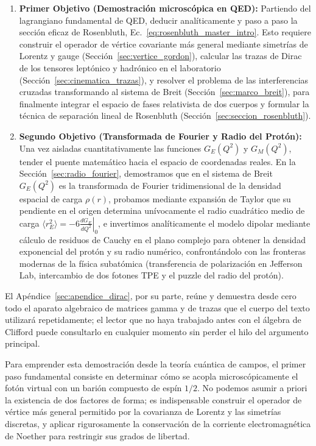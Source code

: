 \documentclass[10pt,a4paper]{article}
\begin{document}
\begin{enumerate}
    \item \textbf{Primer Objetivo (Demostración microscópica en QED):} Partiendo del lagrangiano fundamental de QED, deducir analíticamente y paso a paso la sección eficaz de Rosenbluth, Ec.~\eqref{eq:rosenbluth_master_intro}. Esto requiere construir el operador de vértice covariante más general mediante simetrías de Lorentz y gauge (Sección~\ref{sec:vertice_gordon}), calcular las trazas de Dirac de los tensores leptónico y hadrónico en el laboratorio (Sección~\ref{sec:cinematica_trazas}), y resolver el problema de las interferencias cruzadas transformando al sistema de Breit (Sección~\ref{sec:marco_breit}), para finalmente integrar el espacio de fases relativista de dos cuerpos y formular la técnica de separación lineal de Rosenbluth (Sección~\ref{sec:seccion_rosenbluth}).
    \item \textbf{Segundo Objetivo (Transformada de Fourier y Radio del Protón):} Una vez aisladas cuantitativamente las funciones $G_E(Q^2)$ y $G_M(Q^2)$, tender el puente matemático hacia el espacio de coordenadas reales. En la Sección~\ref{sec:radio_fourier}, demostramos que en el sistema de Breit $G_E(Q^2)$ es la transformada de Fourier tridimensional de la densidad espacial de carga $\rho(r)$, probamos mediante expansión de Taylor que su pendiente en el origen determina unívocamente el radio cuadrático medio de carga $\langle r_E^2 \rangle = -6 \left.\frac{dG_E}{dQ^2}\right|_0$, e invertimos analíticamente el modelo dipolar mediante cálculo de residuos de Cauchy en el plano complejo para obtener la densidad exponencial del protón y su radio numérico, confrontándolo con las fronteras modernas de la física subatómica (transferencia de polarización en Jefferson Lab, intercambio de dos fotones TPE y el puzzle del radio del protón).
\end{enumerate}
El Apéndice~\ref{sec:apendice_dirac}, por su parte, reúne y demuestra desde cero todo el aparato algebraico de matrices gamma y de trazas que el cuerpo del texto utilizará repetidamente; el lector que no haya trabajado antes con el álgebra de Clifford puede consultarlo en cualquier momento sin perder el hilo del argumento principal.

Para emprender esta demostración desde la teoría cuántica de campos, el primer paso fundamental consiste en determinar cómo se acopla microscópicamente el fotón virtual con un barión compuesto de espín $1/2$. No podemos asumir a priori la existencia de dos factores de forma; es indispensable construir el operador de vértice más general permitido por la covarianza de Lorentz y las simetrías discretas, y aplicar rigurosamente la conservación de la corriente electromagnética de Noether para restringir sus grados de libertad.
\end{document}
